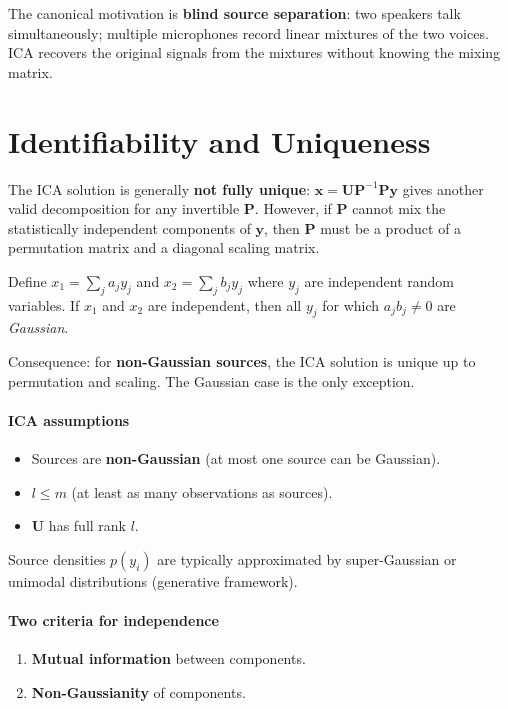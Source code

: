 \documentclass[11pt, oneside]{book}
\begin{document}
The canonical motivation is \textbf{blind source separation}: two speakers talk
simultaneously; multiple microphones record linear mixtures of the two voices.
ICA recovers the original signals from the mixtures without knowing the mixing matrix.


\section{Identifiability and Uniqueness}
\label{sec:ica-uniqueness}

The ICA solution is generally \textbf{not fully unique}: $\bm{x} = \bm{U}\bm{P}^{-1}\bm{P}\bm{y}$
gives another valid decomposition for any invertible $\bm{P}$.
However, if $\bm{P}$ cannot mix the statistically independent components of $\bm{y}$,
then $\bm{P}$ must be a product of a permutation matrix and a diagonal scaling matrix.

\begin{thmbox}[title={Darmois' Theorem (1953) --- ICA Identifiability}]
Define $x_1 = \sum_j a_j y_j$ and $x_2 = \sum_j b_j y_j$ where $y_j$ are independent
random variables.
If $x_1$ and $x_2$ are independent, then all $y_j$ for which $a_j b_j \neq 0$ are
\emph{Gaussian}.

\medskip
Consequence: for \textbf{non-Gaussian sources}, the ICA solution is unique up to
permutation and scaling.
The Gaussian case is the only exception.
\end{thmbox}

\paragraph{ICA assumptions}
\begin{itemize}
  \item Sources are \textbf{non-Gaussian} (at most one source can be Gaussian).
  \item $l \leq m$ (at least as many observations as sources).
  \item $\bm{U}$ has full rank $l$.
\end{itemize}
Source densities $p(y_i)$ are typically approximated by super-Gaussian or unimodal
distributions (generative framework).

\paragraph{Two criteria for independence}
\begin{enumerate}
  \item \textbf{Mutual information} between components.
  \item \textbf{Non-Gaussianity} of components.
\end{enumerate}
\end{document}

